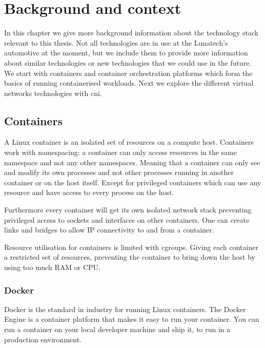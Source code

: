 \chapter{Background and context}
\label{chap:background}

In this chapter we give more background information about the technology stack relevant to this thesis. Not all technologies are in use at the Lunatech's automotive at the moment, but we include them to provide more information about similar technologies or new technologies that we could use in the future. We start with containers and container orchestration platforms which form the basics of running containerised workloads. Next we explore the different virtual networks technologies with \gls{cni}.

\section{Containers}
\label{sec:containers}
A Linux container is an isolated set of resources on a compute host. Containers work with namespacing: a container can only access resources in the same namespace and not any other namespaces. Meaning that a container can only see and modify its own processes and not other processes running in another container or on the host itself. Except for privileged containers which can use any resource and have access to every process on the host. 

Furthermore every container will get its own isolated network stack preventing privileged access to sockets and interfaces on other containers. One can create links and bridges to allow IP connectivity to and from a container.

Resource utilisation for containers is limited with \glspl{cgroup}. Giving each container a restricted set of resources, preventing the container to bring down the host by using too much RAM or CPU\cite{docker_security}.

\subsection{Docker}
\label{subsec:docker}
Docker is the standard in industry for running Linux containers. The Docker Engine is a container platform that makes it easy to run your container. You can run a container on your local developer machine and ship it, to run in a production environment.

